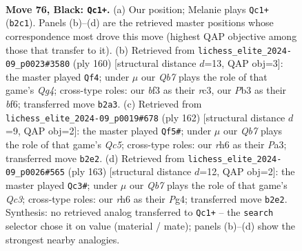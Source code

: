 \documentclass[11pt]{article}
\begin{document}
\clearpage

\begin{figure}[p]\centering
\begin{subfigure}{0.46\textwidth}\centering
\resizebox{\linewidth}{!}{%
\newchessgame
\chessboard[
  setfen={8/8/7R/4b3/8/1p1k1B2/1q6/5K2 b - - 9 76},
  showmover=false,
  pgfstyle=straightmove, color=movearrow, markmove={b2-c1}
]}
\caption{}
\end{subfigure}\hfill
\begin{subfigure}{0.46\textwidth}\centering
\resizebox{\linewidth}{!}{%
\newchessgame
\chessboard[
  setfen={5k2/1K1B4/5b2/8/6Q1/2r5/8/8 w - - 3 81},
  showmover=false,
  pgfstyle=straightmove, color=movearrow, markmove={g4-f4}
]}
\caption{}
\end{subfigure}
\\[4pt]
\begin{subfigure}{0.46\textwidth}\centering
\resizebox{\linewidth}{!}{%
\newchessgame
\chessboard[
  setfen={8/B7/5K2/2Q5/p3k3/P7/8/8 w - - 9 82},
  showmover=false,
  pgfstyle=straightmove, color=movearrow, markmove={c5-f5}
]}
\caption{}
\end{subfigure}\hfill
\begin{subfigure}{0.46\textwidth}\centering
\resizebox{\linewidth}{!}{%
\newchessgame
\chessboard[
  setfen={4b3/4P3/2q5/8/1K4p1/3k4/8/8 b - - 5 82},
  showmover=false,
  pgfstyle=straightmove, color=movearrow, markmove={c6-c3}
]}
\caption{}
\end{subfigure}
\caption{\textbf{Move 76, Black: \texttt{Qc1+}.} (a) Our position; Melanie plays \texttt{Qc1+} (\texttt{b2c1}). Panels (b)--(d) are the retrieved master positions whose correspondence most drove this move (highest QAP objective among those that transfer to it). (b) Retrieved from \texttt{lichess\_elite\_2024-09\_p0023\#3580} (ply 160) [structural distance $d$=13, QAP obj=3]: the master played \texttt{Qf4}; under $\mu$ our \emph{Qb7} plays the role of that game's \emph{Qg4}; cross-type roles: our \emph{b}f3 as their \emph{r}c3, our \emph{P}b3 as their \emph{b}f6; transferred move \texttt{b2a3}. (c) Retrieved from \texttt{lichess\_elite\_2024-09\_p0019\#678} (ply 162) [structural distance $d$=9, QAP obj=2]: the master played \texttt{Qf5\#}; under $\mu$ our \emph{Qb7} plays the role of that game's \emph{Qc5}; cross-type roles: our \emph{r}h6 as their \emph{P}a3; transferred move \texttt{b2e2}. (d) Retrieved from \texttt{lichess\_elite\_2024-09\_p0026\#565} (ply 163) [structural distance $d$=12, QAP obj=2]: the master played \texttt{Qc3\#}; under $\mu$ our \emph{Qb7} plays the role of that game's \emph{Qc3}; cross-type roles: our \emph{r}h6 as their \emph{P}g4; transferred move \texttt{b2e2}. Synthesis: no retrieved analog transferred to \texttt{Qc1+} -- the \texttt{search} selector chose it on value (material / mate); panels (b)--(d) show the strongest nearby analogies.}
\label{fig:thought-m151}
\end{figure}
\end{document}
